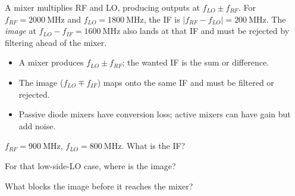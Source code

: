 \begin{workedexample}
A mixer multiplies RF and LO, producing outputs at $f_{LO} \pm f_{RF}$. For
$f_{RF} = 2000\ \text{MHz}$ and $f_{LO} = 1800\ \text{MHz}$, the IF is
$|f_{RF} - f_{LO}| = 200\ \text{MHz}$. The \emph{image} at
$f_{LO} - f_{IF} = 1600\ \text{MHz}$ also lands at that IF and must be rejected
by filtering ahead of the mixer.
\end{workedexample}

\begin{keytakeaways}
\begin{itemize}[leftmargin=1.4em,itemsep=2pt]
\item A mixer produces $f_{LO} \pm f_{RF}$; the wanted IF is the sum or difference.
\item The image ($f_{LO} \mp f_{IF}$) maps onto the same IF and must be filtered or rejected.
\item Passive diode mixers have conversion loss; active mixers can have gain but add noise.
\end{itemize}
\end{keytakeaways}

\begin{exercises}
\item $f_{RF} = 900\ \text{MHz}$, $f_{LO} = 800\ \text{MHz}$. What is the IF?
\item For that low-side-LO case, where is the image?
\item What blocks the image before it reaches the mixer?
\end{exercises}


